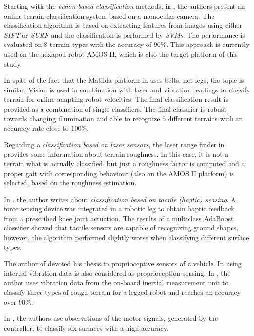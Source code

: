 Starting with the \textit{vision-based classification} methods, in \citep{article:01:visual}, the authors present an online terrain classification system based on a monocular camera. The classification algorithm is based on extracting features from images using either \textit{SIFT} \citep{article:sift} or \textit{SURF} \citep{article:surf} and the classification is performed by \textit{SVMs}. The performance is evaluated on $ 8 $ terrain types with the accuracy of $ 90\% $. This approach is currently used on the hexapod robot AMOS II, which is also the target platform of this study.

In spite of the fact that the Matilda platform in \citep{article:04:onlinelearning} uses belts, not legs, the topic is similar. Vision is used in combination with laser and vibration readings to classify terrain for online adapting robot velocities. The final classification result is provided as a combination of single classifiers. The final classifier is robust towards changing illumination and able to recognize $ 5 $ different terrains with an accuracy rate close to $ 100\% $.

Regarding a \textit{classification based on laser sensors}, the laser range finder in \citep{article:02:laser} provides some information about terrain roughness. In this case, it is not a terrain what is actually classified, but just a roughness factor is computed and a proper gait with corresponding behaviour (also on the AMOS II platform) is selected, based on the roughness estimation.

In \citep{article:06:haptic}, the author writes about \textit{classification based on tactile (haptic) sensing}. A force sensing device was integrated in a robotic leg to obtain haptic feedback from a prescribed knee joint actuation. The results of a multiclass AdaBoost classifier showed that tactile sensors are capable of recognizing ground shapes, however, the algorithm performed slightly worse when classifying different surface types.

The author of \citep{thesis:05:proprioception} devoted his thesis to proprioceptive sensors of a vehicle. In \citep{article:08:rhex} using internal vibration data is also considered as proprioception sensing. In \citep{article:09:roughterrain}, the author uses vibration data from the on-board inertial measurement unit to classify three types of rough terrain for a legged robot and reaches an accuracy over $ 90\% $.

In \citep{article:03:motorsignals}, the authors use observations of the motor signals, generated by the controller, to classify six surfaces with a high accuracy.

